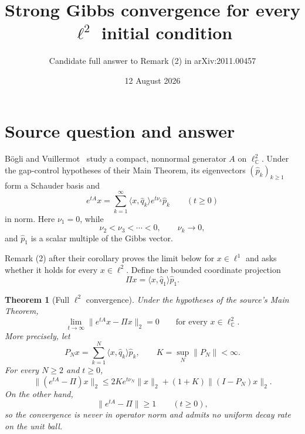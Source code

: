 \documentclass[11pt]{article}
\title{Strong Gibbs convergence for every $\ell^2$ initial condition}
\author{Candidate full answer to Remark (2) in arXiv:2011.00457}
\date{12 August 2026}
\newtheorem{theorem}{Theorem}
\begin{document}
\maketitle

\begin{center}
\end{center}

\section{Source question and answer}

B\"ogli and Vuillermot~\cite{source} study a compact, nonnormal generator $A$
on $\ell^2_{\mathbb C}$.  Under the gap-control hypotheses of their Main
Theorem, its eigenvectors $(\widehat p_k)_{k\geq1}$ form a Schauder basis and
\begin{equation}\label{eq:spectral}
 e^{tA}x=\sum_{k=1}^{\infty}
 \langle x,\widehat q_k\rangle e^{t\nu_k}\widehat p_k
 \qquad(t\geq0)
\end{equation}
in norm.  Here $\nu_1=0$, while
\begin{equation}\label{eq:order}
 \nu_2<\nu_3<\cdots<0,\qquad \nu_k\longrightarrow0,
\end{equation}
and $\widehat p_1$ is a scalar multiple of the Gibbs vector.

Remark (2) after their corollary proves the limit below for $x\in\ell^1$ and
asks whether it holds for every $x\in\ell^2$.  Define the bounded coordinate
projection
\[
 \Pi x=\langle x,\widehat q_1\rangle\widehat p_1.
\]

\begin{theorem}[Full $\ell^2$ convergence]\label{thm:main}
Under the hypotheses of the source's Main Theorem,
\begin{equation}\label{eq:limit}
 \lim_{t\to\infty}\|e^{tA}x-\Pi x\|_2=0
 \qquad\text{for every }x\in\ell^2_{\mathbb C}.
\end{equation}
More precisely, let
\[
 P_Nx=\sum_{k=1}^N\langle x,\widehat q_k\rangle\widehat p_k,
 \qquad K=\sup_N\|P_N\|<\infty.
\]
For every $N\geq2$ and $t\geq0$,
\begin{equation}\label{eq:tail}
 \|(e^{tA}-\Pi)x\|_2
 \leq 2K e^{t\nu_N}\|x\|_2
 +(1+K)\|(I-P_N)x\|_2.
\end{equation}
On the other hand,
\begin{equation}\label{eq:sharp}
 \|e^{tA}-\Pi\|\geq1\qquad(t\geq0),
\end{equation}
so the convergence is never in operator norm and admits no uniform decay rate
on the unit ball.
\end{theorem}
\end{document}
